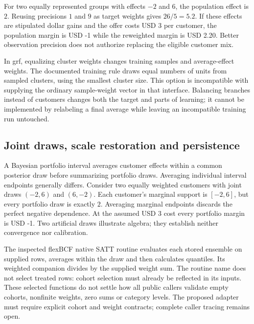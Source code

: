 For two equally represented groups with effects $-2$ and $6$, the population effect is $2$. Reusing precisions $1$ and $9$ as target weights gives $26/5=5.2$. If these effects are stipulated dollar gains and the offer costs USD 3 per customer, the population margin is USD -1 while the reweighted margin is USD 2.20. Better observation precision does not authorize replacing the eligible customer mix.\citep{exec21_cxx_reference}

In grf, equalizing cluster weights changes training samples and average-effect weights. The documented training rule draws equal numbers of units from sampled clusters, using the smallest cluster size. This option is incompatible with supplying the ordinary sample-weight vector in that interface. Balancing branches instead of customers changes both the target and parts of learning; it cannot be implemented by relabeling a final average while leaving an incompatible training run untouched.\citep{exec21_cxx_grf}

\subsection{Joint draws, scale restoration and persistence}
\label{exec21:cxx-draws}
A Bayesian portfolio interval averages customer effects within a common posterior draw before summarizing portfolio draws. Averaging individual interval endpoints generally differs. Consider two equally weighted customers with joint draws $(-2,6)$ and $(6,-2)$. Each customer's marginal support is $[-2,6]$, but every portfolio draw is exactly $2$. Averaging marginal endpoints discards the perfect negative dependence. At the assumed USD 3 cost every portfolio margin is USD -1. Two artificial draws illustrate algebra; they establish neither convergence nor calibration.\citep{exec21_cxx_reference}

The inspected flexBCF native SATT routine evaluates each stored ensemble on supplied rows, averages within the draw and then calculates quantiles. Its weighted companion divides by the supplied weight sum. The routine name does not select treated rows: cohort selection must already be reflected in its inputs. These selected functions do not settle how all public callers validate empty cohorts, nonfinite weights, zero sums or category levels. The proposed adapter must require explicit cohort and weight contracts; complete caller tracing remains open.\citep{exec21_cxx_flexbcf}

